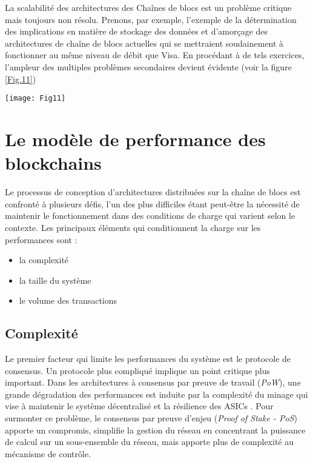 \documentclass[journal]{IEEEtran}
\begin{document}
La scalabilité des architectures des Chaînes de blocs est un problème critique mais toujours non résolu. Prenons, par exemple, l'exemple de la détermination des implications en matière de stockage des données et d’amorçage des architectures de chaîne  de blocs actuelles qui se mettraient soudainement à fonctionner au même niveau de débit que Visa. En procédant à de tels exercices, l'ampleur des multiples problèmes secondaires devient évidente (voir la figure \ref{Fig.11})

\begin{figure*}[h]
         \centering
	\texttt{[image: Fig11]} %
	\caption{Estimation du stockage - Architectures distribuées validées fonctionnant à un débit (TPS) moyen correspondant à celui de VISA } %
	\label{Fig.11} %
\end{figure*}


\section{Le modèle de performance des blockchains}
Le processus de conception d'architectures distribuées sur la chaîne de blocs est confronté à plusieurs défis, l'un des plus difficiles étant peut-être la nécessité de maintenir le fonctionnement dans des conditions de charge qui varient selon le contexte. Les principaux éléments qui conditionnent la charge sur les performances sont :

\begin{itemize}
  \item la complexité
  \item  la taille du système
  \item  le volume des transactions
\end{itemize}

\subsection{Complexité}
Le premier facteur qui limite les performances du système est le protocole de consensus. Un protocole plus compliqué implique un point critique plus important. Dans les architectures à consensus par preuve de travail (\textit{PoW}), une grande dégradation des performances est induite par la complexité du minage qui vise à maintenir le système décentralisé et la résilience des ASICs \cite{50}. 
Pour surmonter ce problème, le consensus par preuve d'enjeu (\textit{Proof of Stake - PoS}) apporte un compromis, simplifie la gestion du réseau en concentrant la puissance de calcul sur un sous-ensemble du réseau, mais apporte plus de complexité au mécanisme de contrôle.
\end{document}
